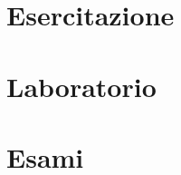 \documentclass[a4paper,12pt,oneside]{book}
\begin{document}
    \part{Esercitazione}
    
    
    
    
    
    
    
    \part{Laboratorio}
    
    
    

    \part{Esami}
    
\end{document}
